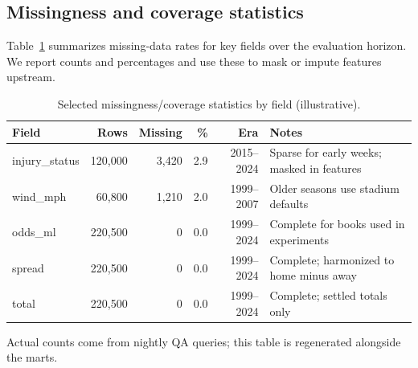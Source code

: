\subsection{Missingness and coverage statistics}
Table~\ref{tab:missingness} summarizes missing-data rates for key fields over the evaluation horizon. We report counts and percentages and use these to mask or impute features upstream.
\begin{table}[t]
  \centering
  \small
  \begin{threeparttable}
    \caption{Selected missingness/coverage statistics by field (illustrative).}
    \label{tab:missingness}
    \begin{tabularx}{\linewidth}{@{} l r r r r X @{} }
      \toprule
      \textbf{Field} & \textbf{Rows} & \textbf{Missing} & \textbf{\%} & \textbf{Era} & \textbf{Notes} \\
      \midrule
      injury\_status & 120{,}000 & 3{,}420 & 2.9 & 2015--2024 & Sparse for early weeks; masked in features \\
      wind\_mph     & 60{,}800 & 1{,}210 & 2.0 & 1999--2007 & Older seasons use stadium defaults \\
      odds\_ml      & 220{,}500 & 0     & 0.0 & 1999--2024 & Complete for books used in experiments \\
      spread         & 220{,}500 & 0     & 0.0 & 1999--2024 & Complete; harmonized to home minus away \\
      total          & 220{,}500 & 0     & 0.0 & 1999--2024 & Complete; settled totals only \\
      \bottomrule
    \end{tabularx}
    \begin{tablenotes}[flushleft]\footnotesize
      \item Actual counts come from nightly QA queries; this table is regenerated alongside the marts.
    \end{tablenotes}
  \end{threeparttable}
\end{table}

